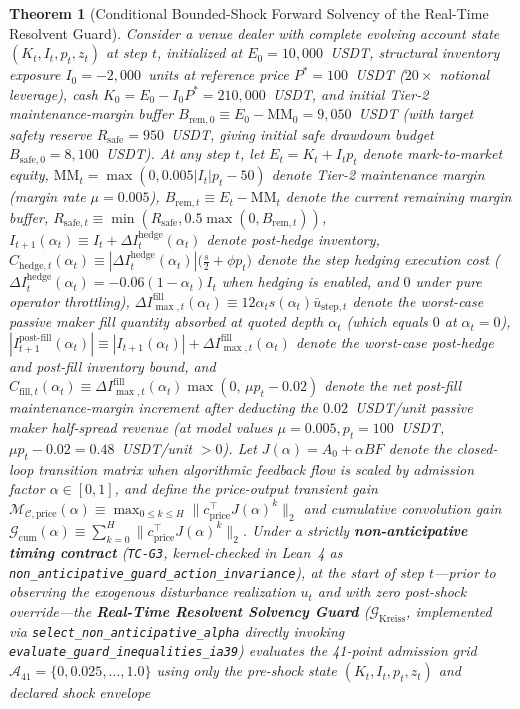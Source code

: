 \documentclass[12pt]{article}
\newtheorem{theorem}{Theorem}[section]
\theoremstyle{definition}
\theoremstyle{remark}
\begin{document}
\begin{theorem}[Conditional Bounded-Shock Forward Solvency of the Real-Time Resolvent Guard]
\label{thm:ia_crash_free_guard}
Consider a venue dealer with complete evolving account state $(K_t, I_t, p_t, z_t)$ at step $t$, initialized at $E_0 = 10{,}000$~USDT, structural inventory exposure $I_0 = -2{,}000$~units at reference price $P^* = 100$~USDT ($20\times$ notional leverage), cash $K_0 = E_0 - I_0 P^* = 210{,}000$~USDT, and initial Tier-2 maintenance-margin buffer $B_{\mathrm{rem},0} \equiv E_0 - \mathrm{MM}_0 = 9{,}050$~USDT (with target safety reserve $R_{\mathrm{safe}} = 950$~USDT, giving initial safe drawdown budget $B_{\mathrm{safe},0} = 8{,}100$~USDT). At any step $t$, let $E_t = K_t + I_t p_t$ denote mark-to-market equity, $\mathrm{MM}_t = \max(0, 0.005|I_t|p_t - 50)$ denote Tier-2 maintenance margin (margin rate $\mu = 0.005$), $B_{\mathrm{rem},t} \equiv E_t - \mathrm{MM}_t$ denote the current remaining margin buffer, $R_{\mathrm{safe},t} \equiv \min(R_{\mathrm{safe}}, 0.5\max(0, B_{\mathrm{rem},t}))$, $I_{t+1}(\alpha_t) \equiv I_t + \Delta I^{\mathrm{hedge}}_t(\alpha_t)$ denote post-hedge inventory, $C_{\mathrm{hedge},t}(\alpha_t) \equiv |\Delta I^{\mathrm{hedge}}_t(\alpha_t)|\bigl(\tfrac{s}{2} + \phi p_t\bigr)$ denote the step hedging execution cost ($\Delta I^{\mathrm{hedge}}_t(\alpha_t) = -0.06(1-\alpha_t)I_t$ when hedging is enabled, and $0$ under pure operator throttling), $\Delta I_{\max,t}^{\mathrm{fill}}(\alpha_t) \equiv 12\alpha_t s(\alpha_t)\bar{u}_{\mathrm{step},t}$ denote the worst-case passive maker fill quantity absorbed at quoted depth $\alpha_t$ (which equals $0$ at $\alpha_t = 0$), $|I_{t+1}^{\mathrm{post\text{-}fill}}(\alpha_t)| \equiv |I_{t+1}(\alpha_t)| + \Delta I_{\max,t}^{\mathrm{fill}}(\alpha_t)$ denote the worst-case post-hedge and post-fill inventory bound, and $C_{\mathrm{fill},t}(\alpha_t) \equiv \Delta I_{\max,t}^{\mathrm{fill}}(\alpha_t)\max(0,\, \mu p_t - 0.02)$ denote the net post-fill maintenance-margin increment after deducting the $0.02$~USDT/unit passive maker half-spread revenue (at model values $\mu = 0.005, p_t = 100$~USDT, $\mu p_t - 0.02 = 0.48$~USDT/unit $> 0$). Let $J(\alpha) = A_0 + \alpha B F$ denote the closed-loop transition matrix when algorithmic feedback flow is scaled by admission factor $\alpha \in [0, 1]$, and define the price-output transient gain $\mathcal{M}_{\mathcal{C},\mathrm{price}}(\alpha) \equiv \max_{0 \le k \le H} \|c_{\mathrm{price}}^\top J(\alpha)^k\|_2$ and cumulative convolution gain $\mathcal{G}_{\mathrm{cum}}(\alpha) \equiv \sum_{k=0}^H \|c_{\mathrm{price}}^\top J(\alpha)^k\|_2$. Under a strictly \textbf{non-anticipative timing contract} (\texttt{TC-G3}, kernel-checked in Lean~4 as \nolinkurl{non_anticipative_guard_action_invariance}), at the start of step $t$---prior to observing the exogenous disturbance realization $u_t$ and with zero post-shock override---the \textbf{Real-Time Resolvent Solvency Guard} ($\mathcal{G}_{\mathrm{Kreiss}}$, implemented via \nolinkurl{select_non_anticipative_alpha} directly invoking \nolinkurl{evaluate_guard_inequalities_ia39}) evaluates the 41-point admission grid $\mathcal{A}_{41} = \{0, 0.025, \dots, 1.0\}$ using only the pre-shock state $(K_t, I_t, p_t, z_t)$ and declared shock envelope 
\end{theorem}
\end{document}
